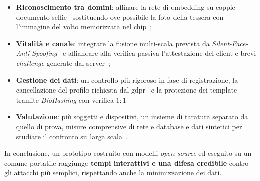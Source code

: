 \begin{itemize}
    \item \textbf{Riconoscimento tra domini}: affinare la rete di embedding su coppie documento-selfie~\cite{albieroIdentityDocumentSelfie2019a} sostituendo ove possibile la foto della tessera con l'immagine del volto memorizzata nel chip~\cite{icao9303};
    \item \textbf{Vitalità e canale}: integrare la fusione multi-scala prevista da \textit{Silent-Face-Anti-Spoofing}~\cite{MinivisionaiSilentFaceAntiSpoofing} e affiancare alla verifica passiva l'attestazione del client e brevi \textit{challenge} generate dal server~\cite{groupBiometricLivenessPresentation};
    \item \textbf{Gestione dei dati}: un controllo più rigoroso in fase di registrazione, la cancellazione del profilo richiesta dal \gls{gdpr}~\cite{REGOLAMENTOUE2016} e la protezione dei template tramite \textit{BioHashing} con verifica $1{:}1$
    \item \textbf{Valutazione}: più soggetti e dispositivi, un insieme di taratura separato da quello di prova, misure comprensive di rete e database e dati sintetici per studiare il confronto su larga scala~\cite{ismayilovFLUXSynIDFrameworkIdentityControlled2025}.
\end{itemize}

\noindent In conclusione, un prototipo costruito con modelli \textit{open source} ed eseguito su un comune portatile raggiunge \textbf{tempi interattivi e una difesa credibile} contro gli attacchi più semplici, rispettando anche la minimizzazione dei dati.